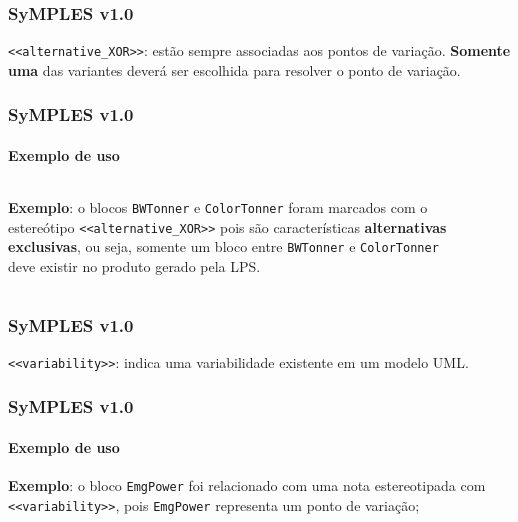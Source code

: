 \begin{frame}
\frametitle{SyMPLES v1.0}

  \texttt{<<alternative\_XOR>>}: estão sempre associadas aos pontos de variação. \textbf{Somente uma} das variantes deverá ser escolhida para resolver o ponto de variação.

\end{frame}


\begin{frame}
\frametitle{SyMPLES v1.0}
\framesubtitle{Exemplo de uso}

  \begin{columns}[onlytextwidth]
    
    \begin{column}{0.6\textwidth}
      \textbf{Exemplo}: o blocos \texttt{BWTonner} e \texttt{ColorTonner} foram marcados com o estereótipo \texttt{<<alternative\_XOR>>} pois são características \textbf{alternativas exclusivas}, ou seja, somente um bloco entre \texttt{BWTonner} e \texttt{ColorTonner} deve existir no produto gerado pela LPS.
    \end{column}
  
    \begin{column}{0.4\textwidth}
      \begin{figure}
      \end{figure}
    \end{column}
    
  \end{columns}

\end{frame}

\begin{frame}
\frametitle{SyMPLES v1.0}

  \texttt{<<variability>>}: indica uma variabilidade existente em um modelo UML.

\end{frame}


\begin{frame}
\frametitle{SyMPLES v1.0}
\framesubtitle{Exemplo de uso}

  \textbf{Exemplo}: o bloco \texttt{EmgPower} foi relacionado com uma nota estereotipada com \texttt{<<variability>>}, pois \texttt{EmgPower} representa um ponto de variação;

  \begin{figure}
  \end{figure}

\end{frame}


